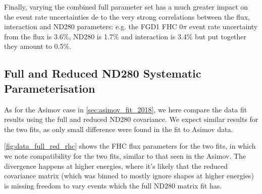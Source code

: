 Finally, varying the combined full parameter set has a much greater impact on the event rate uncertainties de to the very strong correlations between the flux, interaction and ND280 parameters: e.g. the FGD1 FHC 0$\pi$ event rate uncertainty from the flux is 3.6\%, ND280 is 1.7\% and interaction is 3.4\% but put together they amount to 0.5\%.

\subsection{Full and Reduced ND280 Systematic Parameterisation}
As for the Asimov case in \autoref{sec:asimov_fit_2018}, we here compare the data fit results using the full and reduced ND280 covariance. We expect similar results for the two fits, as only small difference were found in the fit to Asimov data.

\autoref{fig:data_full_red_rhc} shows the FHC flux parameters for the two fits, in which we note compatibility for the two fits, similar to that seen in the Asimov. The divergence happens at higher energies, where it's likely that the reduced covariance matrix (which was binned to mostly ignore shapes at higher energies) is missing freedom to vary events which the full ND280 matrix fit has.


